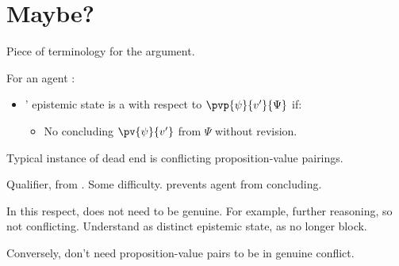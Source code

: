 \section{Maybe?}
\label{sec:maybe}

\begin{note}[A \deadEnd{}]
  Piece of terminology for the argument.

  \begin{definition}[A \deadEnd{0}]
    \label{def:dead-end}
    For an agent \vAgent{}:

    \begin{itemize}
    \item
      \vAgent{}' epistemic state is a \emph{} with respect to \(\pvp{\psi}{v'}{\Psi}\) if:
      \begin{itemize}
      \item
        No concluding \(\pv{\psi}{v'}\) from \(\Psi\) without revision.
      \end{itemize}
    \end{itemize}
    \vspace{-\baselineskip}
  \end{definition}

  Typical instance of dead end is conflicting proposition-value pairings.

  Qualifier, from .
  Some difficulty.
  \deadEnd{} prevents agent from concluding.

  In this respect, \deadEnd{} does not need to be genuine.
  For example, further reasoning, so not conflicting.
  Understand as distinct epistemic state, as no longer block.

  Conversely, don't need proposition-value pairs to be in genuine conflict.
\end{note}


